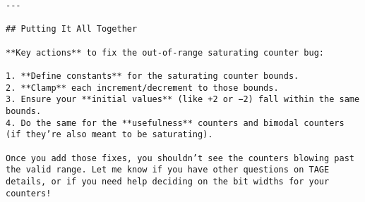 \documentclass[11pt]{article}
\begin{document}
\begin{verbatim}
---

## Putting It All Together

**Key actions** to fix the out-of-range saturating counter bug:

1. **Define constants** for the saturating counter bounds.
2. **Clamp** each increment/decrement to those bounds.
3. Ensure your **initial values** (like +2 or −2) fall within the same bounds.
4. Do the same for the **usefulness** counters and bimodal counters (if they’re also meant to be saturating).

Once you add those fixes, you shouldn’t see the counters blowing past the valid range. Let me know if you have other questions on TAGE details, or if you need help deciding on the bit widths for your counters!
\end{verbatim}
\end{document}
